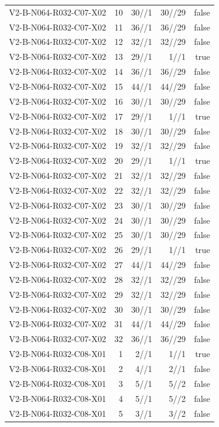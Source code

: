 {\begin{longtable}{lrrrr}
V2-B-N064-R032-C07-X02 & 10 & 30//1 & 30//29 & false \\
V2-B-N064-R032-C07-X02 & 11 & 36//1 & 36//29 & false \\
V2-B-N064-R032-C07-X02 & 12 & 32//1 & 32//29 & false \\
V2-B-N064-R032-C07-X02 & 13 & 29//1 & 1//1 & true \\
V2-B-N064-R032-C07-X02 & 14 & 36//1 & 36//29 & false \\
V2-B-N064-R032-C07-X02 & 15 & 44//1 & 44//29 & false \\
V2-B-N064-R032-C07-X02 & 16 & 30//1 & 30//29 & false \\
V2-B-N064-R032-C07-X02 & 17 & 29//1 & 1//1 & true \\
V2-B-N064-R032-C07-X02 & 18 & 30//1 & 30//29 & false \\
V2-B-N064-R032-C07-X02 & 19 & 32//1 & 32//29 & false \\
V2-B-N064-R032-C07-X02 & 20 & 29//1 & 1//1 & true \\
V2-B-N064-R032-C07-X02 & 21 & 32//1 & 32//29 & false \\
V2-B-N064-R032-C07-X02 & 22 & 32//1 & 32//29 & false \\
V2-B-N064-R032-C07-X02 & 23 & 30//1 & 30//29 & false \\
V2-B-N064-R032-C07-X02 & 24 & 30//1 & 30//29 & false \\
V2-B-N064-R032-C07-X02 & 25 & 30//1 & 30//29 & false \\
V2-B-N064-R032-C07-X02 & 26 & 29//1 & 1//1 & true \\
V2-B-N064-R032-C07-X02 & 27 & 44//1 & 44//29 & false \\
V2-B-N064-R032-C07-X02 & 28 & 32//1 & 32//29 & false \\
V2-B-N064-R032-C07-X02 & 29 & 32//1 & 32//29 & false \\
V2-B-N064-R032-C07-X02 & 30 & 30//1 & 30//29 & false \\
V2-B-N064-R032-C07-X02 & 31 & 44//1 & 44//29 & false \\
V2-B-N064-R032-C07-X02 & 32 & 36//1 & 36//29 & false \\
V2-B-N064-R032-C08-X01 & 1 & 2//1 & 1//1 & true \\
V2-B-N064-R032-C08-X01 & 2 & 4//1 & 2//1 & false \\
V2-B-N064-R032-C08-X01 & 3 & 5//1 & 5//2 & false \\
V2-B-N064-R032-C08-X01 & 4 & 5//1 & 5//2 & false \\
V2-B-N064-R032-C08-X01 & 5 & 3//1 & 3//2 & false \\

\end{longtable}}
